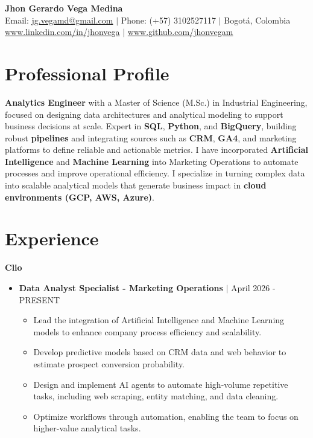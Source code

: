 \documentclass[9pt, letterpaper]{extarticle}
\begin{document}
\setlength{\parindent}{0pt}
    \begin{center}
        {\Huge \textbf{Jhon Gerardo Vega Medina}} \\ \vspace{6pt}
        Email: \href{mailto:jg.vegamd@gmail.com}{jg.vegamd@gmail.com} $\vert$
        Phone: (+57) 3102527117 $\vert$
        Bogotá, Colombia \\ \vspace{3pt}
        \href{https://www.linkedin.com/in/jhonvega}{www.linkedin.com/in/jhonvega} $\vert$
        \href{https://www.github.com/jhonvegam}{www.github.com/jhonvegam}
    \end{center}

    \section*{Professional Profile}
        \textbf{Analytics Engineer} with a Master of Science (M.Sc.) in Industrial Engineering, focused on designing data architectures and analytical modeling to support business decisions at scale. Expert in \textbf{SQL}, \textbf{Python}, and \textbf{BigQuery}, building robust \textbf{pipelines} and integrating sources such as \textbf{CRM}, \textbf{GA4}, and marketing platforms to define reliable and actionable metrics.
    \vspace{5pt}
        I have incorporated \textbf{Artificial Intelligence} and \textbf{Machine Learning} into Marketing Operations to automate processes and improve operational efficiency. I specialize in turning complex data into scalable analytical models that generate business impact in \textbf{cloud environments (GCP, AWS, Azure)}.

    \section*{Experience}

        \noindent \textbf{Clio}
        
        \begin{itemize}[leftmargin=15pt, nosep]
            \item \textbf{Data Analyst Specialist - Marketing Operations} $\vert$ April 2026 - PRESENT
            \begin{itemize}[leftmargin=15pt, label={--}, nosep]
                \item Lead the integration of Artificial Intelligence and Machine Learning models to enhance company process efficiency and scalability.
                \item Develop predictive models based on CRM data and web behavior to estimate prospect conversion probability.
                \item Design and implement AI agents to automate high-volume repetitive tasks, including web scraping, entity matching, and data cleaning.
                \item Optimize workflows through automation, enabling the team to focus on higher-value analytical tasks.
            \end{itemize}
        \end{itemize}
        
\end{document}
